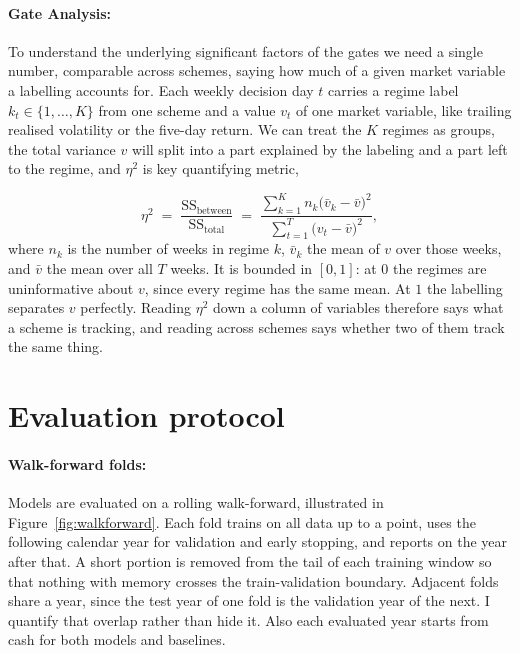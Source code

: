 \paragraph{Gate Analysis:}
To understand the underlying significant factors of the gates we need a single number, comparable across schemes, saying how much of a given market variable a labelling accounts for. Each weekly decision day $t$ carries a regime label $k_t \in \{1,\dots,K\}$ from one scheme and a value $v_t$ of one market variable, like trailing realised volatility or the five-day return. We can treat the $K$ regimes as groups, the total variance $v$ will split into a part explained by the labeling and a part left to the regime, and $\eta^2$ is key quantifying metric,

\begin{equation}
  \eta^2 \;=\; \frac{\mathrm{SS}_{\text{between}}}{\mathrm{SS}_{\text{total}}}
  \;=\;
  \frac{\sum_{k=1}^{K} n_k \big(\bar{v}_k - \bar{v}\big)^2}
       {\sum_{t=1}^{T} \big(v_t - \bar{v}\big)^2},
  \label{eq:eta2}
\end{equation}
where $n_k$ is the number of weeks in regime $k$, $\bar{v}_k$ the mean of $v$ over those weeks, and $\bar{v}$ the mean over all $T$ weeks. It is bounded in $[0,1]$: at $0$ the regimes are uninformative about $v$, since every regime has the same mean. At $1$ the labelling separates $v$ perfectly. Reading $\eta^2$ down a column of variables therefore says what a scheme is tracking, and reading across schemes says whether two of them track the same thing. 

\section{Evaluation protocol}
\label{sec:evaluation}

\paragraph{Walk-forward folds:}
Models are evaluated on a rolling walk-forward, illustrated in Figure~\ref{fig:walkforward}. Each fold trains on all data up to a point, uses the following calendar year for validation and early stopping, and reports on the year after that. A short portion is removed from the tail of each training window so that nothing with memory crosses the train-validation boundary. Adjacent folds share a year, since the test year of one fold is the validation year of the next. I quantify that overlap rather than hide it. Also each evaluated year starts from cash for both models and baselines.

